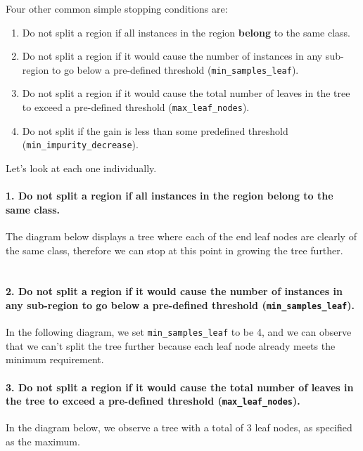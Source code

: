 \documentclass[11pt,a4paper]{report}
\begin{document}
Four other common simple stopping conditions are:
\begin{enumerate}
\item Do not split a region if all instances in the region \textbf{belong} to the same class.
\item Do not split a region if it would cause the number of instances in any sub-region to go below a pre-defined threshold (\texttt{min\_samples\_leaf}).
\item Do not split a region if it would cause the total number of leaves in the tree to exceed a pre-defined threshold (\texttt{max\_leaf\_nodes}).
\item Do not split if the gain is less than some pre\-defined threshold (\texttt{min\_impurity\_decrease}).
\end{enumerate}
Let's look at each one individually.
\paragraph{1. Do not split a region if all instances in the region belong to the same class.} The diagram below displays a tree where each of the end leaf nodes are clearly of the same class, therefore we can stop at this point in growing the tree further.\\
\\
\paragraph{2. Do not split a region if it would cause the number of instances in any sub-region to go below a pre-defined threshold (\texttt{min\_samples\_leaf}).}In the following diagram, we set \texttt{min\_samples\_leaf} to be 4, and we can observe that we can't split the tree further because each leaf node already meets the minimum requirement.\\
\paragraph{3. Do not split a region if it would cause the total number of leaves in the tree to exceed a pre-defined threshold (\texttt{max\_leaf\_nodes}).}In the diagram below, we observe a tree with a total of 3 leaf nodes, as specified as the maximum.\\
\end{document}
